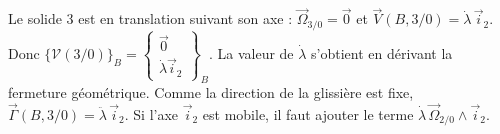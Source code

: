 \begin{corrigebox}
Le solide 3 est en translation suivant son axe :
                $\vec\Omega_{3/0}=\vec0$ et $\vec V(B,3/0)=\dot\lambda\,\vec i_2$.
                Donc $\{\mathcal V(3/0)\}_B=\left\{\begin{array}{c}\vec0\\
                \dot\lambda\vec i_2\end{array}\right\}_B$. La valeur de $\dot\lambda$
                s'obtient en dérivant la fermeture géométrique.
Comme la direction de la glissière est fixe,
                $\vec\Gamma(B,3/0)=\ddot\lambda\,\vec i_2$. Si l'axe $\vec i_2$ est
                mobile, il faut ajouter le terme $\dot\lambda\,\vec\Omega_{2/0}\wedge
                \vec i_2$.
\end{corrigebox}
